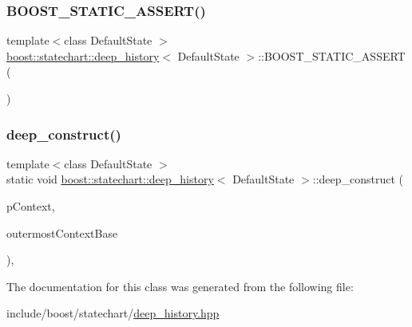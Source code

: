 \subsubsection{\texorpdfstring{B\+O\+O\+S\+T\+\_\+\+S\+T\+A\+T\+I\+C\+\_\+\+A\+S\+S\+E\+R\+T()}{BOOST\_STATIC\_ASSERT()}}
{\footnotesize\ttfamily template$<$class Default\+State $>$ \\
\mbox{\hyperlink{classboost_1_1statechart_1_1deep__history}{boost\+::statechart\+::deep\+\_\+history}}$<$ Default\+State $>$\+::B\+O\+O\+S\+T\+\_\+\+S\+T\+A\+T\+I\+C\+\_\+\+A\+S\+S\+E\+RT (\begin{DoxyParamCaption}\item[{Default\+State\+::context\+\_\+type\+::deep\+\_\+history$<$ Default\+State $>$\+::value}]{ }\end{DoxyParamCaption})}

\mbox{\label{classboost_1_1statechart_1_1deep__history_ae8d6ba724135797f6d0b29139f257aa2}} 
\subsubsection{\texorpdfstring{deep\+\_\+construct()}{deep\_construct()}}
{\footnotesize\ttfamily template$<$class Default\+State $>$ \\
static void \mbox{\hyperlink{classboost_1_1statechart_1_1deep__history}{boost\+::statechart\+::deep\+\_\+history}}$<$ Default\+State $>$\+::deep\+\_\+construct (\begin{DoxyParamCaption}\item[{const \mbox{\hyperlink{classboost_1_1statechart_1_1deep__history_a0b936dd258f9807e4f3901096c289033}{context\+\_\+ptr\+\_\+type}} \&}]{p\+Context,  }\item[{\mbox{\hyperlink{classboost_1_1statechart_1_1deep__history_a2ce3a43f840db416420a3073071c22cc}{outermost\+\_\+context\+\_\+base\+\_\+type}} \&}]{outermost\+Context\+Base }\end{DoxyParamCaption})\hspace{0.3cm}{\ttfamily [inline]}, {\ttfamily [static]}}



The documentation for this class was generated from the following file\+:\begin{DoxyCompactItemize}
\item 
include/boost/statechart/\mbox{\hyperlink{deep__history_8hpp}{deep\+\_\+history.\+hpp}}\end{DoxyCompactItemize}
